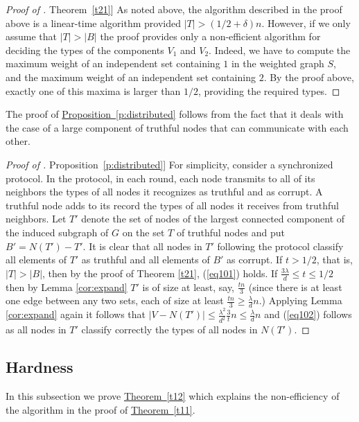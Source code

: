 \documentclass[11pt]{article}
\numberwithin{equation}{section}
\theoremstyle{definition}
\theoremstyle{plain}
\newcommand{\expref}[2]{\hyperref[#2]{#1~\ref{#2}}}
\begin{document}
\begin{proof}[Proof of \expref{Theorem}{t21}]
\noindent
As noted above,  %
the algorithm described in the proof above is a
linear-time algorithm provided $|T|>(1/2+\delta)n$.
However, if we only assume that $|T|>|B|$ the proof
provides only a non-efficient algorithm  for deciding the types of
the components $V_1$ and $V_2$. Indeed, we have to compute the
maximum weight of an independent set containing $1$
in the weighted graph $S$,
and the maximum weight of an independent set 
containing $2$. By the proof above, exactly one of this maxima 
is larger than $1/2$, providing the required types. 
%
\end{proof}    %

\bigskip
The proof of \expref{Proposition}{p:distributed} follows from 
the fact that it deals with the case of a large component 
of truthful nodes that can communicate with each other. 

%
%
%
\begin{proof}[Proof of \expref{Proposition}{p:distributed}]
%
For simplicity, consider a synchronized protocol. In the protocol, 
in each round, each node transmits to all of its
neighbors the  %
%
types  %
of all nodes it recognizes as truthful and as corrupt.  
A truthful node adds to its record 
the types of all nodes it receives from truthful neighbors. Let
$T'$ denote the set of nodes of the 
largest connected component of the induced 
subgraph of $G$ on the set $T$ of truthful nodes and
put $B'=N(T')-T'$. 
It is clear that all nodes in $T'$ following the protocol
classify all elements of $T'$ as truthful and all elements 
of $B'$ as corrupt. 
If $t >1/2$, that is,
$|T| > |B|$, then by the proof of Theorem \ref{t21}, 
(\ref{eq101}) holds.  If $\frac{3\lambda}{d} \leq t \leq 1/2$
then by Lemma \ref{cor:expand} $T'$ is of size  at least, say,
$\frac{tn}{3}$ (since there is at least one edge
between any two sets, each of size at least $\frac{tn}{3} \geq 
\frac{\lambda}{d}n$.)
Applying Lemma \ref{cor:expand} again it follows that
$|V-N(T')| \leq \frac{\lambda^2}{d^2}\frac{3}{t}n \leq
\frac{\lambda}{d} n$ and (\ref{eq102}) follows as all nodes  in
$T'$ classify correctly the types of all nodes in $N(T')$. 
\end{proof} 


\subsection{Hardness} \label{subsec:hardness}

In this subsection we prove \expref{Theorem}{t12} which explains 
the non-efficiency of the algorithm in the proof of \expref{Theorem}{t11}.
\vspace{0.2cm}
\end{document}
